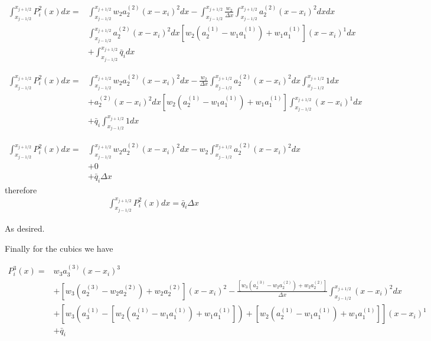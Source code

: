 \documentclass[10pt]{article}
\begin{document}
\begin{align*}
\int_{x_{j-1/2}}^{x_{j+1/2}} P^2_i(x) dx =& \int_{x_{j-1/2}}^{x_{j+1/2}} w_2a^{(2)}_2(x  - x_i)^2 dx -\int_{x_{j-1/2}}^{x_{j+1/2}} \frac{ w_2}{\Delta x}\int_{x_{j-1/2}}^{x_{j+1/2}}a^{(2)}_2(x  - x_i)^2 dx dx  \\
&  \int_{x_{j-1/2}}^{x_{j+1/2}} a^{(2)}_2(x  - x_i)^2 dx \left[w_2\left(a^{(1)}_2 - w_1a^{(1)}_1\right) + w_1a^{(1)}_1\right](x  - x_i)^1 dx \\
&+ \int_{x_{j-1/2}}^{x_{j+1/2}} \bar{q}_i dx
\end{align*}

\begin{align*}
\int_{x_{j-1/2}}^{x_{j+1/2}} P^2_i(x) dx =& \int_{x_{j-1/2}}^{x_{j+1/2}} w_2a^{(2)}_2(x  - x_i)^2 dx - \frac{ w_2}{\Delta x}\int_{x_{j-1/2}}^{x_{j+1/2}}a^{(2)}_2(x  - x_i)^2 dx \int_{x_{j-1/2}}^{x_{j+1/2}} 1 dx  \\
&  +a^{(2)}_2(x  - x_i)^2 dx \left[w_2\left(a^{(1)}_2 - w_1a^{(1)}_1\right) + w_1a^{(1)}_1\right] \int_{x_{j-1/2}}^{x_{j+1/2}} (x  - x_i)^1 dx \\
&+ \bar{q}_i\int_{x_{j-1/2}}^{x_{j+1/2}} 1  dx
\end{align*}

\begin{align*}
\int_{x_{j-1/2}}^{x_{j+1/2}} P^2_i(x) dx =& \int_{x_{j-1/2}}^{x_{j+1/2}} w_2a^{(2)}_2(x  - x_i)^2 dx - w_2\int_{x_{j-1/2}}^{x_{j+1/2}}a^{(2)}_2(x  - x_i)^2 dx  \\
&+  0  \\
&+ \bar{q}_i \Delta x
\end{align*}
therefore
\begin{align*}
\int_{x_{j-1/2}}^{x_{j+1/2}} P^2_i(x) dx =\bar{q}_i \Delta x
\end{align*}

As desired.

Finally for the cubics we have

\begin{align*}
P^3_i(x) = &  w_3a^{(3)}_3(x  - x_i)^3 \\ &+  \left[w_3\left(a^{(3)}_2 - w_2a^{(2)}_2\right) + w_2a^{(2)}_2\right] (x  - x_i)^2 - \frac{\left[w_3\left(a^{(3)}_2 - w_2a^{(2)}_2\right) + w_2a^{(2)}_2\right]}{\Delta x}\int_{x_{j-1/2}}^{x_{j+1/2}}(x  - x_i)^2 dx \\ & + \left[w_3\left(a^{(1)}_3 - \left[w_2\left(a^{(1)}_2 - w_1a^{(1)}_1\right) + w_1a^{(1)}_1\right]\right) + \left[w_2\left(a^{(1)}_2 - w_1a^{(1)}_1\right) + w_1a^{(1)}_1\right]\right](x  - x_i)^1 \\ &+ \bar{q}_i
\end{align*}
\end{document}
